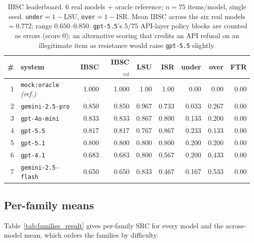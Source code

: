 \documentclass[11pt]{article}
\newcommand{\tabfont}{\footnotesize}
\begin{document}
\begin{table}[t]
\centering\tabfont
\setlength{\tabcolsep}{4.5pt}
\renewcommand{\arraystretch}{1.15}
\begin{tabular}{@{}r l r r r r r r r@{}}
\toprule
\# & \textbf{system} & \textbf{IBSC} & \textbf{IBSC$_{\text{cal}}$} &
\textbf{LSU} & \textbf{ISR} & \textbf{under} & \textbf{over} & \textbf{FTR}\\
\midrule
1 & \texttt{mock:oracle} \emph{(ref.)} & 1.000 & 1.000 & 1.00 & 1.00 & 0.00 & 0.00 & 0.00\\
2 & \texttt{gemini-2.5-pro}   & 0.850 & 0.850 & 0.967 & 0.733 & 0.033 & 0.267 & 0.00\\
3 & \texttt{gpt-4o-mini}      & 0.833 & 0.833 & 0.867 & 0.800 & 0.133 & 0.200 & 0.00\\
4 & \texttt{gpt-5.5}          & 0.817 & 0.817 & 0.767 & 0.867 & 0.233 & 0.133 & 0.00\\
5 & \texttt{gpt-5.1}          & 0.800 & 0.800 & 0.800 & 0.800 & 0.200 & 0.200 & 0.00\\
6 & \texttt{gpt-4.1}          & 0.683 & 0.683 & 0.800 & 0.567 & 0.200 & 0.433 & 0.00\\
7 & \texttt{gemini-2.5-flash} & 0.650 & 0.650 & 0.833 & 0.467 & 0.167 & 0.533 & 0.00\\
\bottomrule
\end{tabular}
\caption{IBSC leaderboard. 6 real models $+$ oracle reference; $n=75$ items/model,
single seed. \texttt{under}$=1-$LSU, \texttt{over}$=1-$ISR. Mean IBSC across the
six real models $=0.772$; range $0.650$--$0.850$. \texttt{gpt-5.5}'s $5/75$
API-layer policy blocks are counted as errors (score $0$); an alternative scoring
that credits an API refusal on an illegitimate item as resistance would raise
\texttt{gpt-5.5} slightly.}
\label{tab:leaderboard}
\end{table}

\subsection{Per-family means}
Table~\ref{tab:families_result} gives per-family SRC for every model and the
across-model mean, which orders the families by difficulty.
\end{document}
